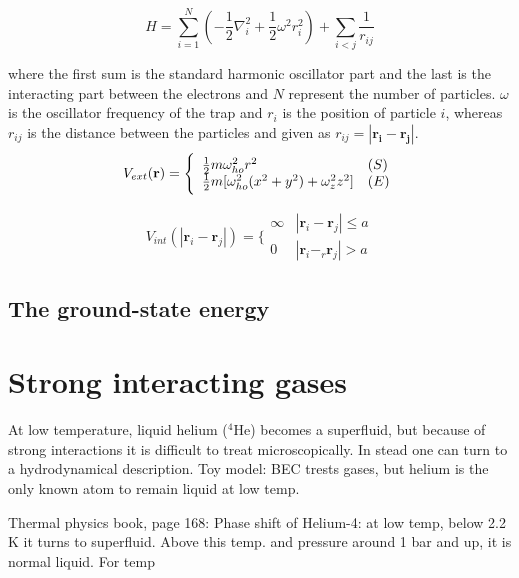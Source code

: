 \begin{equation}\label{eq:hamilt_trap}
\hat{H} = \sum_{i=1}^N \left( - \frac{1}{2} \nabla_i^2 + \frac{1}{2} \omega^2 r_i^2 \right) + \sum_{i<j} \frac{1}{r_{ij}}
\end{equation}

where the first sum is the standard harmonic oscillator part and the last is the interacting part between the electrons and $N$ represent the number of particles. $\omega$ is the oscillator frequency of the trap and $r_i$ is the position of particle $i$, whereas $r_{ij}$ is the distance between the particles and given as $r_{ij} = |\mathbf{r_i} - \mathbf{r_j}|$. \\

\begin{equation} \label{eq:trap_potential}
 V_{ext}(\mathbf{r}) = 
 \Bigg\{
 \begin{array}{ll}
	 \frac{1}{2}m\omega_{ho}^2r^2 & (S)\\
 \strut
	 \frac{1}{2}m[\omega_{ho}^2(x^2+y^2) + \omega_z^2z^2] & (E)
 \end{array}
\end{equation}

\begin{equation} \label{eq:potential_internal}
 V_{int}(|\mathbf{r}_i-\mathbf{r}_j|) =  \Bigg\{
 \begin{array}{ll}
	 \infty & {|\mathbf{r}_i-\mathbf{r}_j|} \leq {a}\\
	 0 & {|\mathbf{r}_i-_r\mathbf{r}_j|} > {a}
 \end{array}
\end{equation}



\subsection{The ground-state energy}

\section{Strong interacting gases}

At low temperature, liquid helium ($^4$He) becomes a superfluid, but because of strong interactions it is difficult to treat microscopically. In stead one can turn to a hydrodynamical description. Toy model: BEC trests gases, but helium is the only known atom to remain liquid at low temp. 

Thermal physics book, page 168:
Phase shift of Helium-4: at low temp, below 2.2 K it turns to superfluid.
Above this temp. and pressure around 1 bar and up, it is normal liquid. For temp 

